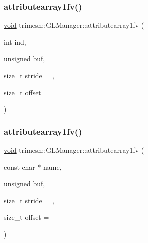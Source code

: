 \subsubsection{\texorpdfstring{attributearray1fv()}{attributearray1fv()}\hspace{0.1cm}{\footnotesize\ttfamily [5/6]}}
{\footnotesize\ttfamily \hyperlink{namespacetrimesh_a784ddfd979e1c579bda795a8edfc3f43}{void} trimesh\+::\+G\+L\+Manager\+::attributearray1fv (\begin{DoxyParamCaption}\item[{int}]{ind,  }\item[{unsigned}]{buf,  }\item[{size\+\_\+t}]{stride = {},  }\item[{size\+\_\+t}]{offset = {} }\end{DoxyParamCaption})\hspace{0.3cm}{\ttfamily [inline]}}

\mbox{\label{classtrimesh_1_1GLManager_a0ed60b070a8243fc861f77d25ec0bfb3}} 
\subsubsection{\texorpdfstring{attributearray1fv()}{attributearray1fv()}\hspace{0.1cm}{\footnotesize\ttfamily [6/6]}}
{\footnotesize\ttfamily \hyperlink{namespacetrimesh_a784ddfd979e1c579bda795a8edfc3f43}{void} trimesh\+::\+G\+L\+Manager\+::attributearray1fv (\begin{DoxyParamCaption}\item[{const char $\ast$}]{name,  }\item[{unsigned}]{buf,  }\item[{size\+\_\+t}]{stride = {},  }\item[{size\+\_\+t}]{offset = {} }\end{DoxyParamCaption})\hspace{0.3cm}{\ttfamily [inline]}}

\mbox{\label{classtrimesh_1_1GLManager_a236a8bb1c11872ff60245ed08713dc99}} 
